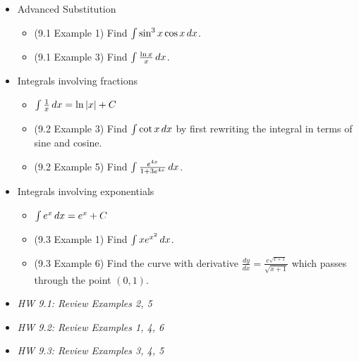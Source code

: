 \documentclass[11pt]{article}
\begin{document}
\begin{itemize}
\item Advanced Substitution
  \begin{itemize}
    \item (9.1 Example 1) Find \(\int \sin^3 x\cos x\,d x\).
    \item (9.1 Example 3) Find \(\int \frac{\ln x}{x}\,d x\).
  \end{itemize}
\item Integrals involving fractions
  \begin{itemize}
    \item \(\int \frac{1}{x}\,d x=\ln|x|+C\)
    \item (9.2 Example 3) Find \(\int\cot x\,d x\) by first rewriting
      the integral in terms of sine and cosine.
    \item (9.2 Example 5) Find \(\int\frac{e^{4x}}{1+3e^{4x}}\,d x\).
  \end{itemize}
\item Integrals involving exponentials
  \begin{itemize}
    \item \(\int e^x\,d x= e^x+C\)
    \item (9.3 Example 1) Find \(\int xe^{x^2}\,d x\).
    \item (9.3 Example 6) Find the curve with derivative
      \(\frac{dy}{dx}=\frac{e^{\sqrt{x+1}}}{\sqrt{x+1}}\) which passes
      through the point \((0,1)\).
  \end{itemize}
\item\textit{
  HW 9.1: Review Examples 2, 5
}
\item\textit{
  HW 9.2: Review Examples 1, 4, 6
}
\item\textit{
  HW 9.3: Review Examples 3, 4, 5
}
\end{itemize}




\end{document}
